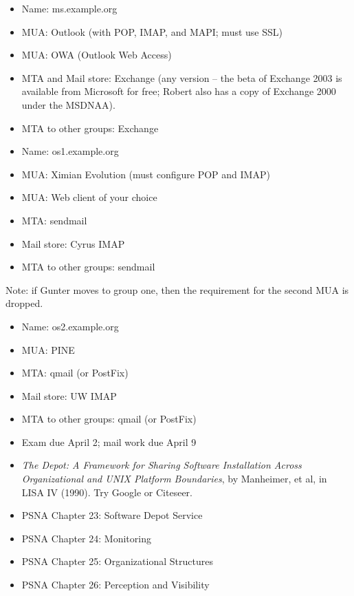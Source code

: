 \documentclass{slides}
\newcommand{\bi}{\begin{itemize}}
\newcommand{\ei}{\end{itemize}}
\begin{document}

\bi
\item Name: ms.example.org
\item MUA: Outlook (with POP, IMAP, and MAPI; must use SSL)
\item MUA: OWA (Outlook Web Access)
\item MTA and Mail store: Exchange (any version -- the beta of Exchange
  2003 is available from Microsoft for free; Robert also has a copy of
  Exchange 2000 under the MSDNAA).  
\item MTA to other groups: Exchange
\ei


\bi
\item Name: os1.example.org
\item MUA: Ximian Evolution (must configure POP and IMAP)
\item MUA: Web client of your choice
\item MTA: sendmail
\item Mail store: Cyrus IMAP
\item MTA to other groups: sendmail
\ei

Note: if Gunter moves to group one, then the requirement for the second
MUA is dropped.


\bi
\item Name: os2.example.org
\item MUA: PINE
\item MTA: qmail (or PostFix)
\item Mail store: UW IMAP
\item MTA to other groups: qmail (or PostFix)
\ei


\bi
\item Exam due April 2; mail work due April 9
\item \emph{The Depot: A Framework for Sharing Software Installation
  Across Organizational and UNIX Platform Boundaries}, by
  Manheimer, et al, in LISA IV (1990).  Try Google or Citeseer.
\item PSNA Chapter 23: Software Depot Service
\item PSNA Chapter 24: Monitoring
\item PSNA Chapter 25: Organizational Structures
\item PSNA Chapter 26: Perception and Visibility
\ei
\end{document}
